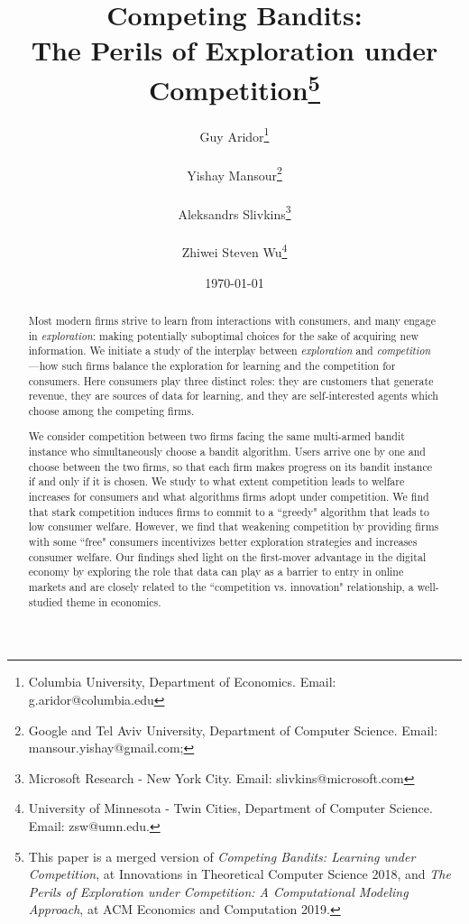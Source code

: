 \documentclass[12pt]{article}
\theoremstyle{definition}
\begin{document}
\begin{titlepage}
\title{Competing Bandits: \\ The Perils of Exploration under Competition\thanks{This paper is a merged version of \textit{Competing Bandits: Learning under Competition}, at Innovations in Theoretical Computer Science 2018, and \textit{The Perils of Exploration under Competition: A Computational Modeling Approach}, at ACM Economics and Computation 2019.}}
\author{Guy Aridor\footnote{Columbia University, Department of Economics. Email: g.aridor@columbia.edu} \rule{0.2in}{0pt} Yishay Mansour\footnote{Google and Tel Aviv University, Department of Computer Science. Email: mansour.yishay@gmail.com;} \rule{0.2in}{0pt}   Aleksandrs Slivkins\footnote{Microsoft Research - New York City. Email: slivkins@microsoft.com} \rule{0.2in}{0pt}   Zhiwei Steven Wu\footnote{University of Minnesota - Twin Cities, Department of Computer Science. Email: zsw@umn.edu.}}
\date{\today}
\maketitle
\begin{abstract}
Most modern firms strive to learn from interactions with consumers, and many engage in \emph{exploration}: making potentially suboptimal choices for the sake of acquiring new information. We initiate a study of the interplay between \emph{exploration} and \emph{competition}—how such firms balance the exploration for learning and the competition for consumers. Here consumers play three distinct roles: they are customers that generate revenue, they are sources of data for learning, and they are self-interested agents which choose among the competing firms.

We consider competition between two firms facing the same multi-armed bandit instance who simultaneously choose a bandit algorithm. Users arrive one by one and choose between the two firms, so that each firm makes progress on its bandit instance if and only if it is chosen. We study to what extent competition leads to welfare increases for consumers and what algorithms firms adopt under competition. We find that stark competition induces firms to commit to a ``greedy" algorithm that leads to low consumer welfare. However, we find that weakening competition by providing firms with some ``free" consumers incentivizes better exploration strategies and increases consumer welfare. Our findings shed light on the first-mover advantage in the digital economy by exploring the role that data can play as a barrier to entry in online markets and are closely related to the ``competition vs. innovation" relationship, a well-studied theme in economics.

\vspace{0.2in}

\bigskip
\end{abstract}
\setcounter{page}{0}
\thispagestyle{empty}
\end{titlepage}
\pagebreak \newpage
\end{document}
